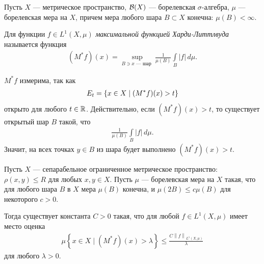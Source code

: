 \begin{df}
 Пусть $X$ --- метрическое пространство, $\mathcal{B}(X)$ --- борелевская $\sigma$-алгебра, $\mu$ --- борелевская мера на $X$, причем мера любого шара $B \subset X$ конечна: $\mu(B) < \infty$.

 Для функции $f \in L^{1}(X, \mu)$ \textit{максимальной функцией Харди-Литтлвуда} называется функция
\begin{align*}
 (M^{\ast}f)(x) = \sup_{B \ni x \text{ --- шар }} \frac{1}{\mu(B)} \int\limits_{B} \left| f \right| \, d\mu  
.\end{align*}
\end{df}
\begin{remrk}
 $M^{\ast}f$ измерима, так как \begin{align*}
  E_t = \left\{ x \in X \;\middle|\; (M^{\ast} f)(x) > t \right\} 
 \end{align*} открыто для любого $t \in \mathbb{R}$. Действительно, если $(M^{\ast}f)(x) > t$, то существует открытый шар $B$ такой, что \begin{align*}
  \frac{1}{\mu(B)} \int\limits_{B} \left| f \right| \, d\mu
 .\end{align*} Значит, на всех точках $y \in B$ из шара будет выполнено $(M^{\ast}f)(x) > t$.
\end{remrk}
\begin{thm}
\label{theorem:hardy_littlewood}
 Пусть $X$ --- сепарабельное ограниченное метрическое пространство: $\rho(x, y) \leqslant R$ для любых $x,y \in X$. Пусть $\mu$ --- борелевская мера на $X$ такая, что для любого шара $B$ в $X$ мера $\mu(B)$ конечна, и $\mu(2B) \leqslant c \mu(B)$ для некоторого $c > 0$.

 Тогда существует константа $C > 0$ такая, что для любой $f \in L^{1}(X, \mu)$ имеет место оценка \begin{align*}
  \mu \left\{ x \in X \mid (M^{\ast}f)(x) > \lambda \right\} \leqslant \frac{C \left\| f \right\|_{L^{1}(X,\mu)}}{\lambda}
 \end{align*} для любого $\lambda > 0$.
\end{thm}
